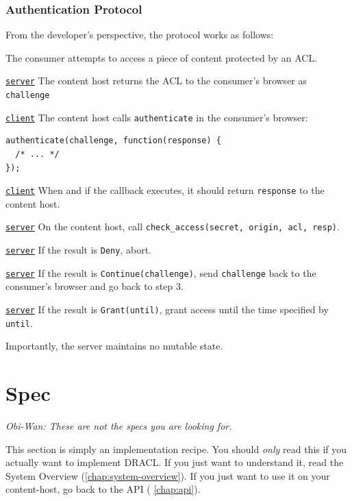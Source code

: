 \documentclass[pdftex,12pt,a4papaer,twoside,notitlepage]{report}
\begin{document}
\subsection{Authentication Protocol}

From the developer's perspective, the protocol works as follows:

\newcommand{\server}{\underline{\texttt{server}}}
\newcommand{\client}{\underline{\texttt{client}}}

\begin{compactenum}
\item The consumer attempts to access a piece of content protected by an ACL.
\item \server{} The content host returns the ACL to the consumer's browser as
  \texttt{challenge}
\item \client{} The content host calls \texttt{authenticate} in the
  consumer's browser:
  \begin{verbatim}
authenticate(challenge, function(response) {
  /* ... */
});
\end{verbatim}
\item \client{} When and if the callback executes, it should return
  \texttt{response} to the content host.
\item \server{} On the content host, call \verb=check_access(secret, origin, acl, resp)=.
\item \server{} If the result is \texttt{Deny}, abort.
\item \server{} If the result is \texttt{Continue(challenge)}, send \texttt{challenge}
  back to the consumer's browser and go back to step 3.
\item \server{} If the result is \texttt{Grant(until)}, grant access until the
  time specified by \texttt{until}.
\end{compactenum}

Importantly, the server maintains no mutable state.

\chapter{Spec}

\emph{Obi-Wan: These are not the specs you are looking for.}

This section is simply an implementation recipe. You should \emph{only} read
this if you actually want to implement DRACL. If you just want to understand it,
read the System Overview (\cref{chap:system-overview}). If you just want to use
it on your content-host, go back to the API ( \cref{chap:api}).
\end{document}
